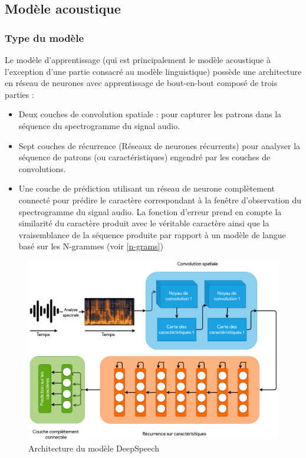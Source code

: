	\subsection{Modèle acoustique}
		\subsubsection*{Type du modèle}
		Le modèle d'apprentissage (qui est principalement le modèle acoustique à l'exception d'une partie consacré au modèle linguistique) possède une architecture en réseau de neurones avec apprentissage de bout-en-bout composé de trois parties : 
		\begin{itemize}
			\item Deux couches de convolution spatiale : pour capturer les patrons dans la séquence du spectrogramme du signal audio.
			\item Sept couches de récurrence (Réseaux de neurones récurrents) pour analyser la séquence de patrons (ou caractéristiques) engendré par les couches de convolutions. 
			\item Une couche de prédiction utilisant un réseau de neurone complètement connecté pour prédire le caractère correspondant à la fenêtre d'observation du spectrogramme du signal audio. La fonction d'erreur prend en compte la similarité du caractère produit avec le véritable caractère ainsi que la vraisemblance de la séquence produite par rapport à un modèle de langue basé sur les N-grammes (voir \ref{n-grams})
		\end{itemize}
		\begin{figure}[H] 
			\label{deep_speech_arch}
			\centering
			\includegraphics[width=0.88\linewidth]{images/Conception/ASR/deeps_speech_arch.png}
			\caption{Architecture du modèle DeepSpeech \cite{deepspeech_paper}}
		\end{figure}
